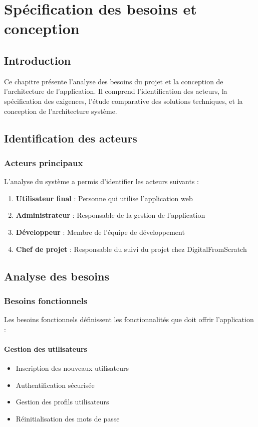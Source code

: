 \chapter{Spécification des besoins et conception}

\section{Introduction}

Ce chapitre présente l'analyse des besoins du projet et la conception de l'architecture de l'application. Il comprend l'identification des acteurs, la spécification des exigences, l'étude comparative des solutions techniques, et la conception de l'architecture système.

\section{Identification des acteurs}

\subsection{Acteurs principaux}

L'analyse du système a permis d'identifier les acteurs suivants :

\begin{enumerate}
    \item \textbf{Utilisateur final} : Personne qui utilise l'application web
    \item \textbf{Administrateur} : Responsable de la gestion de l'application
    \item \textbf{Développeur} : Membre de l'équipe de développement
    \item \textbf{Chef de projet} : Responsable du suivi du projet chez DigitalFromScratch
\end{enumerate}

\section{Analyse des besoins}

\subsection{Besoins fonctionnels}

Les besoins fonctionnels définissent les fonctionnalités que doit offrir l'application :

\subsubsection{Gestion des utilisateurs}
\begin{itemize}
    \item Inscription des nouveaux utilisateurs
    \item Authentification sécurisée
    \item Gestion des profils utilisateurs
    \item Réinitialisation des mots de passe
\end{itemize}

